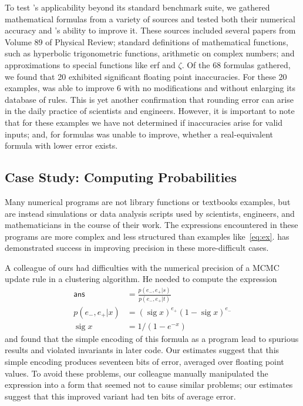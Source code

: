 \documentclass[paper.tex]{subfiles}
\begin{document}
To test \casio's applicability beyond its standard benchmark suite, we
gathered mathematical formulas from a variety of sources and tested
both their numerical accuracy and \casio's ability to improve it.
These sources included several papers from Volume 89 of Physical
Review; standard definitions of mathematical functions, such as
hyperbolic trigonometric functions, arithmetic on complex numbers; and
approximations to special functions like \textsf{erf} and $\zeta$.  Of the
68 formulas gathered, we found that 20 exhibited significant floating
point inaccuracies.  For these 20 examples, \casio was able to improve
6 with no modifications and without enlarging its database of rules.
This is yet another confirmation that rounding error can arise in the
daily practice of scientists and engineers.  However, it is important
to note that for these examples we have not determined if inaccuracies
arise for valid inputs; and, for formulas \casio was unable to
improve, whether a real-equivalent formula with lower error exists.

\subsection{Case Study: Computing Probabilities}

Many numerical programs are not library functions or textbooks
examples, but are instead simulations or data analysis scripts used by
scientists, engineers, and mathematicians in the course of their work.
The expressions encountered in these programs are more complex and
less structured than examples like~\eqref{eq:ex}.  \casio has
demonstrated success in improving precision in these more-difficult
cases.

A colleague of ours had difficulties with the numerical precision of a
MCMC update rule in a clustering algorithm.  He needed to compute the
expression
\begin{align*}
\mathsf{ans} &= \frac{p(e_-,e_+|s)}{p(e_-,e_+|t)} \\
p(e_-, e_+|x) &= (\operatorname{sig} x)^{e_+} (1 - \operatorname{sig} x)^{e_-} \\
\operatorname{sig}x &= 1 / (1 - e^{-x})
\end{align*}
and found that the simple encoding of this formula as a program lead
to spurious results and violated invariants in later code.  Our
estimates suggest that this simple encoding produces seventeen bits of
error, averaged over floating point values.  To avoid these problems,
our colleague manually manipulated the expression into a form that
seemed not to cause similar problems; our estimates suggest that this
improved variant had ten bits of average error.
\end{document}
